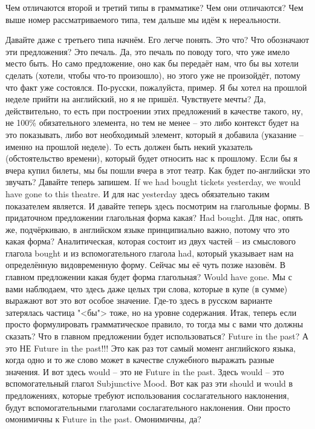 \documentclass[main.tex]{subfiles}
\begin{document}
Чем отличаются второй и третий типы в грамматике?
Чем они отличаются?
Чем выше номер рассматриваемого типа, тем дальше мы идём к нереальности.

Давайте даже с третьего типа начнём.
Его легче понять.
Это что?
Что обозначают эти предложения?
Это печаль.
Да, это печаль по поводу того, что уже имело место быть.
Но само предложение, оно как бы передаёт нам, что бы вы хотели сделать (хотели, чтобы что-то произошло), но этого уже не произойдёт, потому что факт уже состоялся.
По-русски, пожалуйста, пример.
Я бы хотел на прошлой неделе прийти на английский, но я не пришёл.
Чувствуете мечты?
Да, действительно, то есть при построении этих предложений в качестве такого, ну, не 100\% обязательного элемента, но тем не менее -- это либо контекст будет на это показывать, либо вот необходимый элемент, который я добавила (указание -- именно на прошлой неделе).
То есть должен быть некий указатель (обстоятельство времени), который будет относить нас к прошлому.
Если бы я вчера купил билеты, мы бы пошли вчера в этот театр.
Как будет по-английски это звучать?
Давайте теперь запишем.
If we had bought tickets yesterday, we would have gone to this theatre.
И для нас yesterday здесь обязательно таким показателем является.
И давайте теперь здесь посмотрим на глагольные формы.
В придаточном предложении глагольная форма какая?
Had bought.
Для нас, опять же, подчёркиваю, в английском языке принципиально важно, потому что это какая форма?
Аналитическая, которая состоит из двух частей -- из смыслового глагола bought и из вспомогательного глагола had, который указывает нам на определённую видовременную форму.
Сейчас мы её чуть позже назовём.
В главном предложении какая будет форма глагольная?
Would have gone.
Мы с вами наблюдаем, что здесь даже целых три слова, которые в купе (в сумме) выражают вот это вот особое значение.
Где-то здесь в русском варианте затерялась частица "<бы"> тоже, но на уровне содержания.
Итак, теперь если просто формулировать грамматическое правило, то тогда мы с вами что должны сказать?
Что в главном предложении будет использоваться?
Future in the past?
А это НЕ Future in the past!!!
Это как раз тот самый момент английского языка, когда одно и то же слово может в качестве служебного выражать разные значения.
И вот здесь would -- это не Future in the past.
Здесь would -- это вспомогательный глагол Subjunctive Mood.
Вот как раз эти should и would в предложениях, которые требуют использования сослагательного наклонения, будут вспомогательными глаголами сослагательного наклонения.
Они просто омонимичны к Future in the past.
Омонимичны, да?
\end{document}
